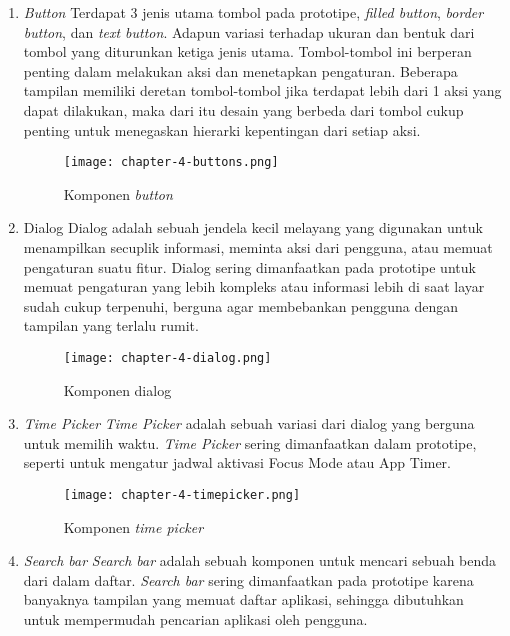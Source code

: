 \begin{enumerate}
  \item \textit{Button}
  \subitem Terdapat 3 jenis utama tombol pada prototipe, \textit{filled button}, \textit{border button}, dan \textit{text button}. Adapun variasi terhadap ukuran dan bentuk dari tombol yang diturunkan ketiga jenis utama. Tombol-tombol ini berperan penting dalam melakukan aksi dan menetapkan pengaturan. Beberapa tampilan memiliki deretan tombol-tombol jika terdapat lebih dari 1 aksi yang dapat dilakukan, maka dari itu desain yang berbeda dari tombol cukup penting untuk menegaskan hierarki kepentingan dari setiap aksi.
    \begin{figure}[h]
      \centering
      \texttt{[image: chapter-4-buttons.png]}
      \caption{Komponen \textit{button}}
      \label{img:button}
    \end{figure}
    \FloatBarrier
  
  \item Dialog
  \subitem Dialog adalah sebuah jendela kecil melayang yang digunakan untuk menampilkan secuplik informasi, meminta aksi dari pengguna, atau memuat pengaturan suatu fitur. Dialog sering dimanfaatkan pada prototipe untuk memuat pengaturan yang lebih kompleks atau informasi lebih di saat layar sudah cukup terpenuhi, berguna agar membebankan pengguna dengan tampilan yang terlalu rumit.

  \begin{figure}[h]
    \centering
    \texttt{[image: chapter-4-dialog.png]}
    \caption{Komponen dialog}
    \label{img:dialog}
  \end{figure}
  \FloatBarrier

  \item \textit{Time Picker}
  \subitem \textit{Time Picker} adalah sebuah variasi dari dialog yang berguna untuk memilih waktu. \textit{Time Picker} sering dimanfaatkan dalam prototipe, seperti untuk mengatur jadwal aktivasi Focus Mode atau App Timer.
  
  \begin{figure}[h]
    \centering
    \texttt{[image: chapter-4-timepicker.png]}
    \caption{Komponen \textit{time picker}}
    \label{img:timepicker}
  \end{figure}
  \FloatBarrier

  \item \textit{Search bar}
  \subitem \textit{Search bar} adalah sebuah komponen untuk mencari sebuah benda dari dalam daftar. \textit{Search bar} sering dimanfaatkan pada prototipe karena banyaknya tampilan yang memuat daftar aplikasi, sehingga dibutuhkan untuk mempermudah pencarian aplikasi oleh pengguna.
 

\end{enumerate}
